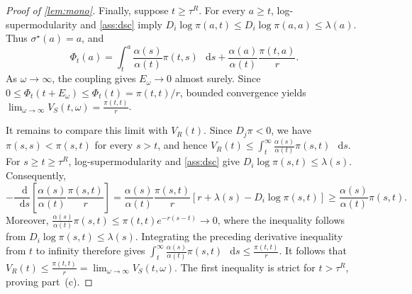 \documentclass[12pt,reqno]{article}
\newcommand{\de}{\mathop{}\!\mathrm{d}}
\theoremstyle{definition} \newtheorem{example}{Example}
\theoremstyle{definition} \newtheorem{condition}{Condition}
\theoremstyle{definition} \newtheorem{corollary}{Corollary}
\theoremstyle{definition} \newtheorem{claim}{Claim}
\theoremstyle{definition} \newtheorem{definition}{Definition}
\theoremstyle{definition} \newtheorem{conjecture}{Conjecture}
\theoremstyle{definition} \newtheorem{Lemma}{Lemma}
\theoremstyle{definition} \newtheorem{lemma}{Lemma}
\theoremstyle{plain} \newtheorem{theorem}{Theorem}
\theoremstyle{definition} \newtheorem{assumption}{Assumption}
\theoremstyle{definition} \newtheorem*{assumptionnonumber}{Assumption}
\theoremstyle{definition} \newtheorem*{theoremNoNumber}{Proposition}
\theoremstyle{definition}
\theoremstyle{definition}\newtheorem{proposition}{Proposition}
\theoremstyle{definition} \newtheorem{result}{Result}
\theoremstyle{definition} \newtheorem*{definitionNoNumber}{Definition}
\theoremstyle{definition} \newtheorem{Definition}{Definition}
\theoremstyle{definition} \newtheorem*{DefinitionNoNumber}{Definition}
\theoremstyle{definition} \newtheorem*{fact}{Fact}
\theoremstyle{definition} \newtheorem*{property}{Property}
\theoremstyle{definition} \newtheorem{remark}{Remark}
\begin{document}
\begin{proof}[Proof of \cref{lem:mono}]
Finally, suppose $t\geq\tau^R$. For every $a\geq t$,
log-supermodularity and \cref{ass:dsc} imply
$D_i\log\pi(a,t) \leq D_i\log\pi(a,a) \leq \lambda(a)$.
Thus $\sigma^\star(a)=a$, and
\[
\Phi_t(a)
=
\int_t^a
\frac{\alpha(s)}{\alpha(t)}\pi(t,s)\,\de s
+
\frac{\alpha(a)}{\alpha(t)}
\frac{\pi(t,a)}{r}.
\]
As $\omega\to\infty$, the coupling gives $E_\omega\to 0$ almost
surely. Since
$0\leq\Phi_t(t+E_\omega)\leq\Phi_t(t)=\pi(t,t)/r$, bounded
convergence yields
$\lim_{\omega\to\infty}V_S(t,\omega)
=
\frac{\pi(t,t)}{r}$.

It remains to compare this limit with $V_R(t)$. Since $D_j\pi<0$,
we have $\pi(s,s)<\pi(s,t)$ for every $s>t$, and hence
$V_R(t)
\leq
\int_t^\infty
\frac{\alpha(s)}{\alpha(t)}\pi(s,t)\,\de s$.
For $s\geq t\geq\tau^R$, log-supermodularity and \cref{ass:dsc} give
$D_i\log\pi(s,t)\leq\lambda(s)$. Consequently,
\[
-\frac{\de}{\de s}
\left[
\frac{\alpha(s)}{\alpha(t)}
\frac{\pi(s,t)}{r}
\right]
=
\frac{\alpha(s)}{\alpha(t)}
\frac{\pi(s,t)}{r}
\left[
r+\lambda(s)-D_i\log\pi(s,t)
\right]
\geq
\frac{\alpha(s)}{\alpha(t)}\pi(s,t).
\]
Moreover, $\frac{\alpha(s)}{\alpha(t)}\pi(s,t)
\leq
\pi(t,t)e^{-r(s-t)}
\longrightarrow
0$,
where the inequality follows from
$D_i\log\pi(s,t)\leq\lambda(s)$. Integrating the preceding derivative
inequality from $t$ to infinity therefore gives
$\int_t^\infty
\frac{\alpha(s)}{\alpha(t)}\pi(s,t)\,\de s
\leq
\frac{\pi(t,t)}{r}$.
It follows that
$V_R(t)
\leq
\frac{\pi(t,t)}{r}
=
\lim_{\omega\to\infty}V_S(t,\omega)$.
The first inequality is strict for $t>\tau^R$, proving part~(c).
\end{proof}
\end{document}
